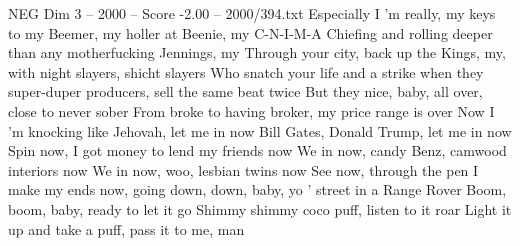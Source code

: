 \begin{textsample}{NEG Dim 3 – 2000 – Score -2.00 – 2000/394.txt}
Especially I 'm really, my keys to my Beemer, my holler at Beenie, my C-N-I-M-A Chiefing and rolling deeper than any motherfucking Jennings, my Through your city, back up the Kings, my, with night slayers, shicht slayers Who snatch your life and a strike when they super-duper producers, sell the same beat twice But they nice, baby, all over, close to never sober From broke to having broker, my price range is over Now I 'm knocking like Jehovah, let me in now Bill Gates, Donald Trump, let me in now Spin now, I got money to lend my friends now We in now, candy Benz, camwood interiors now We in now, woo, lesbian twins now See now, through the pen I make my ends now, going down, down, baby, yo ' street in a Range Rover Boom, boom, baby, ready to let it go Shimmy shimmy coco puff, listen to it roar Light it up and take a puff, pass it to me, man

\end{textsample}
